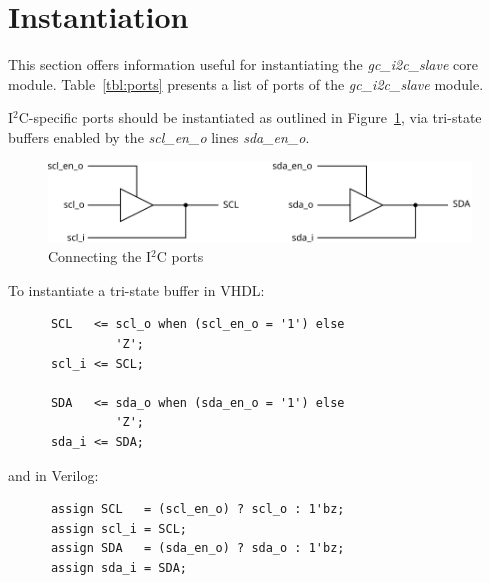 \documentclass[a4paper,11pt]{article}
\begin{document}
\section{Instantiation}
\label{sec:instantiation}

This section offers information useful for instantiating the \textit{gc\_i2c\_slave} core module. 
Table~\ref{tbl:ports} presents a list of ports of the \textit{gc\_i2c\_slave} module. 

I$^2$C-specific ports should be instantiated as outlined in Figure~\ref{fig:i2c-ports}, via 
tri-state buffers enabled by the \textit{scl\_en\_o} lines \textit{sda\_en\_o}.

\begin{figure}[h]
  \centerline{\includegraphics[width=.75\textwidth]{fig/i2c-ports}}
  \caption{Connecting the I$^2$C ports}
  \label{fig:i2c-ports}
\end{figure}

To instantiate a tri-state buffer in VHDL:

\footnotesize
\begin{verbatim}
      SCL   <= scl_o when (scl_en_o = '1') else
               'Z';
      scl_i <= SCL;

      SDA   <= sda_o when (sda_en_o = '1') else
               'Z';
      sda_i <= SDA;
\end{verbatim}

\normalsize
\noindent and in Verilog:

\footnotesize
\begin{verbatim}
      assign SCL   = (scl_en_o) ? scl_o : 1'bz;
      assign scl_i = SCL;
      assign SDA   = (sda_en_o) ? sda_o : 1'bz;
      assign sda_i = SDA;
\end{verbatim}

\normalsize
\end{document}
